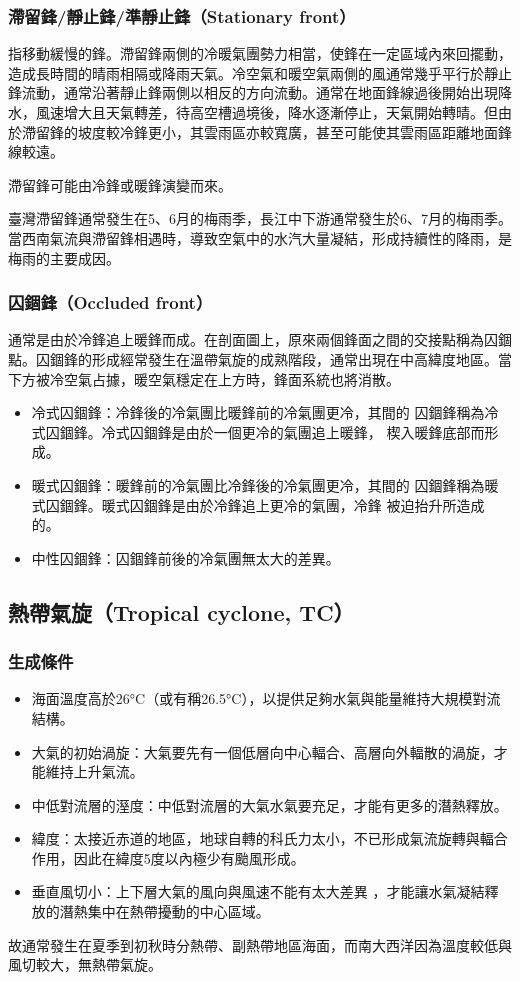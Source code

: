 \documentclass[a4paper,12pt]{report}
\begin{document}
\begin{itemize}
\subsubsection{滯留鋒/靜止鋒/準靜止鋒（Stationary front）}
指移動緩慢的鋒。滯留鋒兩側的冷暖氣團勢力相當，使鋒在一定區域內來回擺動，造成長時間的晴雨相隔或降雨天氣。冷空氣和暖空氣兩側的風通常幾乎平行於靜止鋒流動，通常沿著靜止鋒兩側以相反的方向流動。通常在地面鋒線過後開始出現降水，風速增大且天氣轉差，待高空槽過境後，降水逐漸停止，天氣開始轉晴。但由於滯留鋒的坡度較冷鋒更小，其雲雨區亦較寬廣，甚至可能使其雲雨區距離地面鋒線較遠。

滯留鋒可能由冷鋒或暖鋒演變而來。

臺灣滯留鋒通常發生在5、6月的梅雨季，長江中下游通常發生於6、7月的梅雨季。當西南氣流與滯留鋒相遇時，導致空氣中的水汽大量凝結，形成持續性的降雨，是梅雨的主要成因。
\subsubsection{囚錮鋒（Occluded front）}
通常是由於冷鋒追上暖鋒而成。在剖面圖上，原來兩個鋒面之間的交接點稱為囚錮點。囚錮鋒的形成經常發生在溫帶氣旋的成熟階段，通常出現在中高緯度地區。當下方被冷空氣占據，暖空氣穩定在上方時，鋒面系統也將消散。
\begin{itemize}
  \item 冷式囚錮鋒：冷鋒後的冷氣團比暖鋒前的冷氣團更冷，其間的 囚錮鋒稱為冷式囚錮鋒。冷式囚錮鋒是由於一個更冷的氣團追上暖鋒， 楔入暖鋒底部而形成。
  \item 暖式囚錮鋒：暖鋒前的冷氣團比冷鋒後的冷氣團更冷，其間的 囚錮鋒稱為暖式囚錮鋒。暖式囚錮鋒是由於冷鋒追上更冷的氣團，冷鋒 被迫抬升所造成的。
  \item 中性囚錮鋒：囚錮鋒前後的冷氣團無太大的差異。
\end{itemize}
\subsection{熱帶氣旋（Tropical cyclone, TC）}
\subsubsection{生成條件}
\bct\bfH\ctr{}\ef\FB\ect
\begin{itemize}
  \item 海面溫度高於26°C（或有稱26.5°C），以提供足夠水氣與能量維持大規模對流結構。
  \item 大氣的初始渦旋：大氣要先有一個低層向中心輻合、高層向外輻散的渦旋，才能維持上升氣流。
  \item 中低對流層的溼度：中低對流層的大氣水氣要充足，才能有更多的潛熱釋放。
  \item 緯度：太接近赤道的地區，地球自轉的科氏力太小，不已形成氣流旋轉與輻合作用，因此在緯度5度以內極少有颱風形成。
  \item 垂直風切小：上下層大氣的風向與風速不能有太大差異 ，才能讓水氣凝結釋放的潛熱集中在熱帶擾動的中心區域。
\end{itemize}
故通常發生在夏季到初秋時分熱帶、副熱帶地區海面，而南大西洋因為溫度較低與風切較大，無熱帶氣旋。

\end{itemize}
\end{document}
